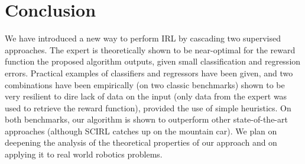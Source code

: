 \documentclass[smallextended]{svjour3}
\begin{document}
\section{Conclusion}
\label{sec:conclusion}
We have introduced a new way to perform IRL by cascading two supervised approaches. The expert is theoretically shown to be near-optimal for the reward function the proposed algorithm outputs, given small classification and regression errors. Practical examples of classifiers and regressors have been given, and two combinations have been empirically (on two classic benchmarks) shown to be very resilient to dire lack of data on the input (only data from the expert was used to retrieve the reward function), provided the use of simple heuristics. On both benchmarks, our algorithm is shown to outperform other state-of-the-art approaches (although SCIRL catches up on the mountain car). We plan on deepening the analysis of the theoretical properties of our approach and on applying it to real world robotics problems.



\end{document}

